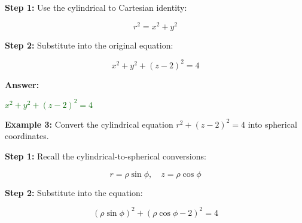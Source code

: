 \documentclass[10pt]{article}                               %
\begin{document}
\begin{adjustwidth}{2em}{0pt}
\begin{adjustwidth}{2em}{0pt}
\begin{examplebox}
            \begin{adjustwidth}{2em}{0pt}
        
                \textbf{Step 1:} Use the cylindrical to Cartesian identity:
        
                \vspace{0.25em}
        
                \[ r^2 = x^2 + y^2 \]
        
                \vspace{0.5em}
        
                \textbf{Step 2:} Substitute into the original equation:
        
                \vspace{0.25em}
        
                \[ x^2 + y^2 + (z - 2)^2 = 4 \]
        
                \vspace{0.5em}
        
                \textbf{Answer:}
        
                \vspace{0.25em}
        
                \textcolor{darkgreen}{\( x^2 + y^2 + (z - 2)^2 = 4 \)}
        
            \end{adjustwidth}

            \textbf{Example 3:} Convert the cylindrical equation \( r^2 + (z - 2)^2 = 4 \) into spherical coordinates.
            \vspace{0.5em}

            \begin{adjustwidth}{2em}{0pt}
            
                \textbf{Step 1:} Recall the cylindrical-to-spherical conversions:
                \vspace{0.25em}
            
                \[
                r = \rho\sin\phi, \quad z = \rho\cos\phi
                \]
            
                \vspace{0.5em}
            
                \textbf{Step 2:} Substitute into the equation:
                \vspace{0.25em}
            
                \[
                (\rho\sin\phi)^2 + (\rho\cos\phi - 2)^2 = 4
                \]
            

\end{adjustwidth}
\end{examplebox}
\end{adjustwidth}
\end{adjustwidth}
\end{document}
